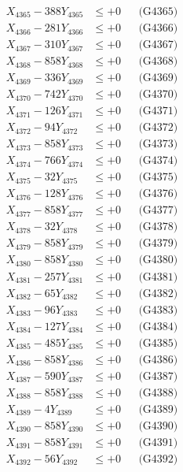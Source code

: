 \documentclass[a4paper,10pt]{article}
\begin{document}
{\begin{align}
X_{4365} - 388Y_{4365} &\leq +0 && \text{(G4365)} \\
X_{4366} - 281Y_{4366} &\leq +0 && \text{(G4366)} \\
X_{4367} - 310Y_{4367} &\leq +0 && \text{(G4367)} \\
X_{4368} - 858Y_{4368} &\leq +0 && \text{(G4368)} \\
X_{4369} - 336Y_{4369} &\leq +0 && \text{(G4369)} \\
X_{4370} - 742Y_{4370} &\leq +0 && \text{(G4370)} \\
\allowbreak
X_{4371} - 126Y_{4371} &\leq +0 && \text{(G4371)} \\
X_{4372} - 94Y_{4372} &\leq +0 && \text{(G4372)} \\
X_{4373} - 858Y_{4373} &\leq +0 && \text{(G4373)} \\
X_{4374} - 766Y_{4374} &\leq +0 && \text{(G4374)} \\
X_{4375} - 32Y_{4375} &\leq +0 && \text{(G4375)} \\
X_{4376} - 128Y_{4376} &\leq +0 && \text{(G4376)} \\
X_{4377} - 858Y_{4377} &\leq +0 && \text{(G4377)} \\
X_{4378} - 32Y_{4378} &\leq +0 && \text{(G4378)} \\
X_{4379} - 858Y_{4379} &\leq +0 && \text{(G4379)} \\
X_{4380} - 858Y_{4380} &\leq +0 && \text{(G4380)} \\
\allowbreak
X_{4381} - 257Y_{4381} &\leq +0 && \text{(G4381)} \\
X_{4382} - 65Y_{4382} &\leq +0 && \text{(G4382)} \\
X_{4383} - 96Y_{4383} &\leq +0 && \text{(G4383)} \\
X_{4384} - 127Y_{4384} &\leq +0 && \text{(G4384)} \\
X_{4385} - 485Y_{4385} &\leq +0 && \text{(G4385)} \\
X_{4386} - 858Y_{4386} &\leq +0 && \text{(G4386)} \\
X_{4387} - 590Y_{4387} &\leq +0 && \text{(G4387)} \\
X_{4388} - 858Y_{4388} &\leq +0 && \text{(G4388)} \\
X_{4389} - 4Y_{4389} &\leq +0 && \text{(G4389)} \\
X_{4390} - 858Y_{4390} &\leq +0 && \text{(G4390)} \\
\allowbreak
X_{4391} - 858Y_{4391} &\leq +0 && \text{(G4391)} \\
X_{4392} - 56Y_{4392} &\leq +0 && \text{(G4392)} \\

\end{align}}
\end{document}
